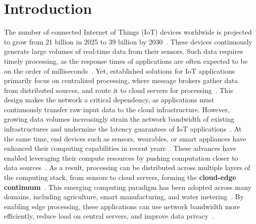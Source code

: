 \documentclass[runningheads]{llncs}
\begin{document}
\section{Introduction}

The number of connected Internet of Things (IoT) devices worldwide is projected to grow from 21 billion in 2025 to 39 billion by 2030~\cite{iot-stats-2025}. 
These devices continuously generate large volumes of real-time data from their sensors. 
Such data requires timely processing, as the response times of applications are often expected to be on the order of milliseconds~\cite{clap, acsos24}. 
Yet, established solutions for IoT applications primarily focus on centralized processing, where message brokers gather data from distributed sources, and route it to cloud servers for processing~\cite{cec-survey-1}. 
This design makes the network a critical dependency, as applications must continuously transfer raw input data to the cloud infrastructure. 
However, growing data volumes increasingly strain the network bandwidth of existing infrastructures and undermine the latency guarantees of IoT applications~\cite{cec-survey-2}. 
%
At the same time, end devices such as sensors, wearables, or smart appliances have enhanced their computing capabilities in recent years~\cite{edge-comp-16}. 
These advances have enabled leveraging their compute resources by pushing computation closer to data sources~\cite{in-sensor-comp-2020,iot-computing-exploit-2018,iot-computing-2016}. 
As a result, processing can be distributed across multiple layers of the computing stack, from sensors to cloud servers, forming the \textbf{cloud-edge continuum}~\cite{cec-survey-1}. 
This emerging computing paradigm has been adopted across many domains, including agriculture, smart manufacturing, and water metering~\cite{cec-survey-1,domenico2023,cec-survey-2}. 
By enabling edge processing, these applications can use network bandwidth more efficiently, reduce load on central servers, and improve data privacy~\cite{sec-survey}. %
\end{document}
